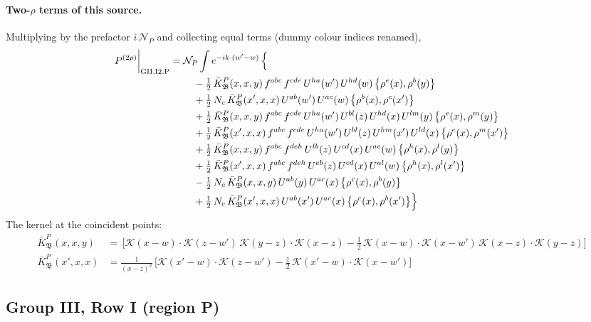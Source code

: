 \documentclass[10pt]{article}
\numberwithin{equation}{section}
\newcommand{\KK}{\mathcal K}
\newcommand{\NP}{\mathcal N_{P}}
\begin{document}
\paragraph{Two-$\rho$ terms of this source.} Multiplying by the prefactor $i\,\NP$ and collecting equal terms (dummy colour indices renamed),
\begin{align}
P^{(2\rho)}\bigg|_{\rm GII.I2.P}={}&\NP\int e^{-ik\cdot(w'-w)}\,\Big\{\notag\\
&\quad -\tfrac12\,\bar K^{P}_{\mathfrak B}(x,x,y)\,f^{abc}\,f^{cde}\,U^{ha}(w')\,U^{hd}(w)\,\big\{\rho^{e}(x),\rho^{b}(y)\big\}\notag\\
&\quad +\tfrac12\,N_{c}\,\bar K^{P}_{\mathfrak B}(x',x,x)\,U^{ab}(w')\,U^{ac}(w)\,\big\{\rho^{b}(x),\rho^{c}(x')\big\}\notag\\
&\quad +\tfrac12\,\bar K^{P}_{\mathfrak B}(x,x,y)\,f^{abc}\,f^{cde}\,U^{ha}(w')\,U^{bl}(z)\,U^{hd}(x)\,U^{lm}(y)\,\big\{\rho^{e}(x),\rho^{m}(y)\big\}\notag\\
&\quad +\tfrac12\,\bar K^{P}_{\mathfrak B}(x',x,x)\,f^{abc}\,f^{cde}\,U^{ha}(w')\,U^{bl}(z)\,U^{hm}(x')\,U^{ld}(x)\,\big\{\rho^{e}(x),\rho^{m}(x')\big\}\notag\\
&\quad +\tfrac12\,\bar K^{P}_{\mathfrak B}(x,x,y)\,f^{abc}\,f^{deh}\,U^{lb}(z)\,U^{cd}(x)\,U^{ae}(w)\,\big\{\rho^{h}(x),\rho^{l}(y)\big\}\notag\\
&\quad +\tfrac12\,\bar K^{P}_{\mathfrak B}(x',x,x)\,f^{abc}\,f^{deh}\,U^{eb}(z)\,U^{cd}(x)\,U^{al}(w)\,\big\{\rho^{h}(x),\rho^{l}(x')\big\}\notag\\
&\quad -\tfrac12\,N_{c}\,\bar K^{P}_{\mathfrak B}(x,x,y)\,U^{ab}(y)\,U^{ac}(x)\,\big\{\rho^{c}(x),\rho^{b}(y)\big\}\notag\\
&\quad +\tfrac12\,N_{c}\,\bar K^{P}_{\mathfrak B}(x',x,x)\,U^{ab}(x')\,U^{ac}(x)\,\big\{\rho^{c}(x),\rho^{b}(x')\big\}\Big\}\label{B:eq:res-GII.I2.P}
\end{align}
The kernel at the coincident points:
\begin{align*}
\bar K^{P}_{\mathfrak B}(x,x,y)&=\,\Big[\KK(x-w)\cdot\KK(z-w')\,\KK(y-z)\cdot\KK(x-z)-\frac{1}{2}\,\KK(x-w)\cdot\KK(x-w')\,\KK(x-z)\cdot\KK(y-z)\Big]\\\bar K^{P}_{\mathfrak B}(x',x,x)&=\frac{1}{(x-z)^2}\,\Big[\KK(x'-w)\cdot\KK(z-w')-\frac{1}{2}\,\KK(x'-w)\cdot\KK(x-w')\Big]
\end{align*}
\subsection{Group III, Row I (region P)}\label{B:sec:GIII.I.P}
\end{document}
